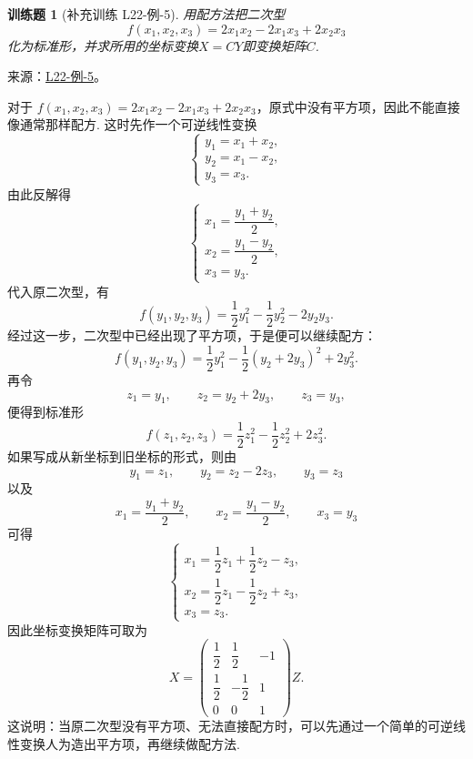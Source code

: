 \documentclass[12pt,fontset=fandol]{ctexart}
\newtheorem{exercise}{训练题}[section]
\begin{document}
\begin{exercise}[补充训练 L22-例-5]\label{prob:L22-例-5}
用配方法把二次型
    \[f(x_1,x_2,x_3)=2x_1x_2-2x_1x_3+2x_2x_3\]
    化为标准形，并求所用的坐标变换$X=CY$即变换矩阵$C$.
\end{exercise}
\noindent 来源：\href{https://github.com/yhwu-is/Linear-Algebra-Left-Undone/blob/new/%E8%AE%B2%E4%B9%89/%E4%B8%93%E9%A2%98/22%20%E4%BA%8C%E6%AC%A1%E5%9E%8B.tex}{L22-例-5}。
\begin{solve}
对于 $f(x_1,x_2,x_3)=2x_1x_2-2x_1x_3+2x_2x_3$，原式中没有平方项，因此不能直接像通常那样配方. 这时先作一个可逆线性变换
    \[
        \begin{cases}
            y_1 = x_1+x_2, \\
            y_2 = x_1-x_2, \\
            y_3 = x_3.
        \end{cases}
    \]
    由此反解得
    \[
        \begin{cases}
            x_1 = \dfrac{y_1+y_2}{2}, \\
            x_2 = \dfrac{y_1-y_2}{2}, \\
            x_3 = y_3.
        \end{cases}
    \]
    代入原二次型，有
    \[ f(y_1, y_2, y_3) = \frac{1}{2}y_1^2-\frac{1}{2}y_2^2-2y_2y_3. \]
    经过这一步，二次型中已经出现了平方项，于是便可以继续配方：
    \[ f(y_1, y_2, y_3) = \frac{1}{2}y_1^2-\frac{1}{2}(y_2+2y_3)^2+2y_3^2. \]
    再令
    \[
        z_1=y_1,\qquad z_2=y_2+2y_3,\qquad z_3=y_3,
    \]
    便得到标准形
    \[
        f(z_1,z_2,z_3)=\frac{1}{2}z_1^2-\frac{1}{2}z_2^2+2z_3^2.
    \]
    如果写成从新坐标到旧坐标的形式，则由
    \[
        y_1=z_1,\qquad y_2=z_2-2z_3,\qquad y_3=z_3
    \]
    以及
    \[
        x_1=\frac{y_1+y_2}{2},\qquad x_2=\frac{y_1-y_2}{2},\qquad x_3=y_3
    \]
    可得
    \[
        \begin{cases}
            x_1 = \dfrac{1}{2}z_1+\dfrac{1}{2}z_2-z_3, \\
            x_2 = \dfrac{1}{2}z_1-\dfrac{1}{2}z_2+z_3, \\
            x_3 = z_3.
        \end{cases}
    \]
    因此坐标变换矩阵可取为
    \[
        X=
        \begin{pmatrix}
            \dfrac{1}{2} & \dfrac{1}{2} & -1 \\
            \dfrac{1}{2} & -\dfrac{1}{2} & 1 \\
            0 & 0 & 1
        \end{pmatrix}
        Z.
    \]
    这说明：当原二次型没有平方项、无法直接配方时，可以先通过一个简单的可逆线性变换人为造出平方项，再继续做配方法.
\end{solve}
\end{document}
